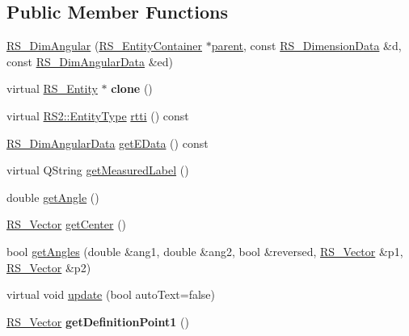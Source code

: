 \subsection*{Public Member Functions}
\begin{DoxyCompactItemize}
\item 
\hyperlink{classRS__DimAngular_a52c79547503adaabb23fe0ffee308291}{R\-S\-\_\-\-Dim\-Angular} (\hyperlink{classRS__EntityContainer}{R\-S\-\_\-\-Entity\-Container} $\ast$\hyperlink{classRS__Entity_a80358a8d2fc6739a516a278dc500b49f}{parent}, const \hyperlink{classRS__DimensionData}{R\-S\-\_\-\-Dimension\-Data} \&d, const \hyperlink{classRS__DimAngularData}{R\-S\-\_\-\-Dim\-Angular\-Data} \&ed)
\item 
\hypertarget{classRS__DimAngular_a89c82acdf4b748adaee9a3cb3bf7c0b4}{virtual \hyperlink{classRS__Entity}{R\-S\-\_\-\-Entity} $\ast$ {\bfseries clone} ()}\label{classRS__DimAngular_a89c82acdf4b748adaee9a3cb3bf7c0b4}

\item 
virtual \hyperlink{classRS2_a8f26d1b981e1e85cff16738b43337e6a}{R\-S2\-::\-Entity\-Type} \hyperlink{classRS__DimAngular_a61612ec4f173f4939b6c5ee73c6fa4f4}{rtti} () const 
\item 
\hyperlink{classRS__DimAngularData}{R\-S\-\_\-\-Dim\-Angular\-Data} \hyperlink{classRS__DimAngular_aa327ca7159e156c2fc87caecbc329049}{get\-E\-Data} () const 
\item 
virtual Q\-String \hyperlink{classRS__DimAngular_a3e59b896af677fc1c96273828200c44a}{get\-Measured\-Label} ()
\item 
double \hyperlink{classRS__DimAngular_ada448046606eb6dc1a9dc66dca4b2504}{get\-Angle} ()
\item 
\hyperlink{classRS__Vector}{R\-S\-\_\-\-Vector} \hyperlink{classRS__DimAngular_a3097dd72aa47a7e9c59d25addb26bd0d}{get\-Center} ()
\item 
bool \hyperlink{classRS__DimAngular_a2b8f0c0b94eb1fd506564ccf7b8f54e6}{get\-Angles} (double \&ang1, double \&ang2, bool \&reversed, \hyperlink{classRS__Vector}{R\-S\-\_\-\-Vector} \&p1, \hyperlink{classRS__Vector}{R\-S\-\_\-\-Vector} \&p2)
\item 
virtual void \hyperlink{classRS__DimAngular_a8b9c5bb5735a23315d99536a9457685b}{update} (bool auto\-Text=false)
\item 
\hypertarget{classRS__DimAngular_a2df981579921655b6ec2eec22501bb8b}{\hyperlink{classRS__Vector}{R\-S\-\_\-\-Vector} {\bfseries get\-Definition\-Point1} ()}\label{classRS__DimAngular_a2df981579921655b6ec2eec22501bb8b}


\end{DoxyCompactItemize}
